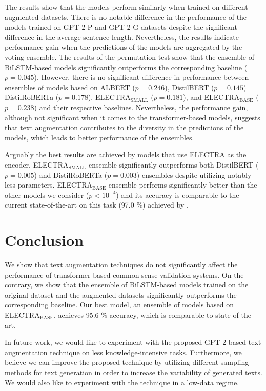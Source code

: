 \documentclass[10pt, a4paper]{article}
\begin{document}
The results show that the models perform similarly when trained on different augmented datasets. There is no notable difference in the performance of the models trained on GPT-2-P and GPT-2-G datasets despite the significant difference in the average sentence length. Nevertheless, the results indicate performance gain when the predictions of the models are aggregated by the voting ensemble. The results of the permutation test show that the ensemble of BiLSTM-based models significantly outperforms the corresponding baseline ($p=0.045$). However, there is no significant difference in performance between ensembles of models based on ALBERT ($p=0.246$), DistilBERT ($p=0.145$) DistilRoBERTa ($p=0.178$), ELECTRA$_\text{SMALL}$ ($p=0.181$), and ELECTRA$_\text{BASE}$ ($p=0.238$) and their respective baselines. Nevertheless, the performance gain, although not significant when it comes to the transformer-based models, suggests that text augmentation contributes to the diversity in the predictions of the models, which leads to better performance of the ensembles. 

Arguably the best results are achieved by models that use ELECTRA as the encoder. ELECTRA$_\text{SMALL}$ ensemble significantly outperforms both DistilBERT ($p = 0.005$) and DistilRoBERTa ($p = 0.003$) ensembles despite utilizing notably less parameters. ELECTRA$_\text{BASE}$-ensemble performs significantly better than the other models we consider ($p < 10^{-4}$) and its accuracy is comparable to the current state-of-the-art on this task (97.0 \%) achieved by \citet{zhang-etal-2020-cn}. 
\section{Conclusion}
 We show that text augmentation techniques do not significantly affect the performance of transformer-based common sense validation systems. On the contrary, we show that the ensemble of BiLSTM-based models trained on the original dataset and the augmented datasets significantly outperforms the corresponding baseline. Our best model, an ensemble of models based on ELECTRA$_\text{BASE}$, achieves 95.6 \% accuracy, which is comparable to state-of-the-art.

In future work, we would like to experiment with the proposed GPT-2-based text augmentation technique on less knowledge-intensive tasks. Furthermore, we believe we can improve the proposed technique by utilizing different sampling methods for text generation in order to increase the variability of generated texts. We would also like to experiment with the technique in a low-data regime.


 
\end{document}

